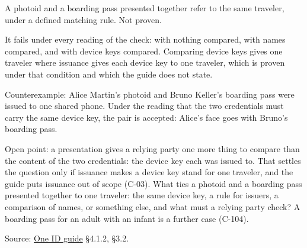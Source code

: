 \begin{theorem}
  \label{thm:g03}
  A photoid and a boarding pass presented together refer to the same
  traveler, under a defined matching rule.  Not proven.

  It fails under every reading of the check: with nothing compared, with
  names compared, and with device keys compared.  Comparing device keys gives
  one traveler where issuance gives each device key to one traveler, which is
  proven under that condition and which the guide does not state.

  Counterexample: Alice Martin's photoid and Bruno Keller's boarding pass were
  issued to one shared phone.  Under the reading that the two credentials must
  carry the same device key, the pair is accepted: Alice's face goes with
  Bruno's boarding pass.

  Open point: a presentation gives a relying party one more thing to compare
  than the content of the two credentials: the device key each was issued to.
  That settles the question only if issuance makes a device key stand for one
  traveler, and the guide puts issuance out of scope (C-03).  What ties a
  photoid and a boarding pass presented together to one traveler: the same
  device key, a rule for issuers, a comparison of names, or something else,
  and what must a relying party check?  A boarding pass for an adult with an
  infant is a further case (C-104).

  Source:
  \href{https://standards.atlassian.net/wiki/spaces/OneID/pages/2947416082/Technical+Implementation+Guide}{One ID guide} §4.1.2, §3.2.
\end{theorem}

